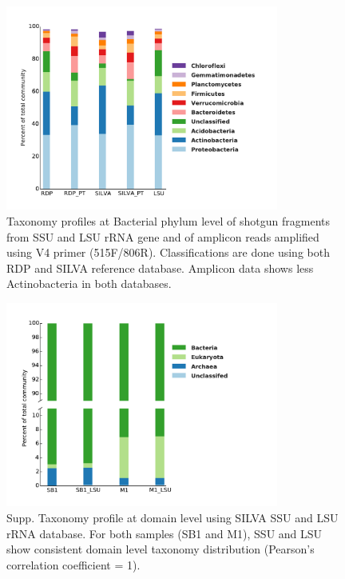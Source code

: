 \documentclass[12pt]{article}
\begin{document}
\begin{figure}[tbph!]
  \centering
  \includegraphics[width=0.8\textwidth]{figs/V4_M1_taxa}

  \caption[Taxonomy profiles at Bacterial phylum level of shotgun
  fragments and of amplicon reads amplified using V4 primer]{Taxonomy
  profiles at Bacterial phylum level of shotgun fragments from SSU and
  LSU rRNA gene and of amplicon reads amplified using V4 primer
  (515F/806R). Classifications are done using both RDP and SILVA
  reference database. Amplicon data shows less Actinobacteria in both
  databases.}

  \label{fig:V4_M1_taxa}
\end{figure}

\begin{figure}[tbph!]
  \centering
  \includegraphics[width=0.8\textwidth]{figs/LSU_domain_taxa}

  \caption[Taxonomy profile at domain level using SILVA SSU and LSU
  rRNA database]{Supp. Taxonomy profile at domain level using SILVA
  SSU and LSU rRNA database. For both samples (SB1 and M1), SSU and
  LSU show consistent domain level taxonomy distribution (Pearson’s
  correlation coefficient = 1).}

  \label{fig:LSU_domain_taxa}
\end{figure}
\end{document}
